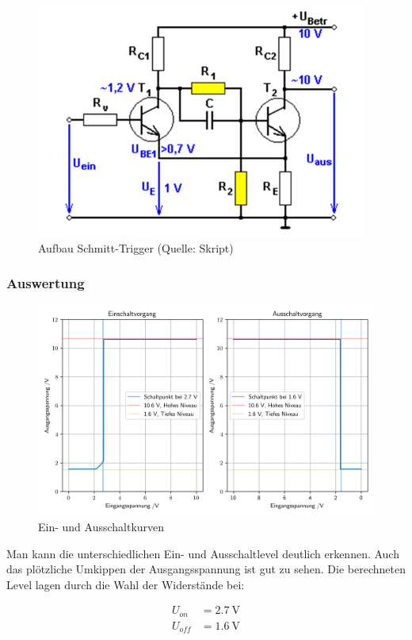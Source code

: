 \documentclass[12pt,twoside,a4paper]{scrartcl}
\begin{document}
				\begin{figure}[H]
					\centering
					\includegraphics[width = 0.8 \textwidth]{Pictures/schmitt}
					\caption{Aufbau Schmitt-Trigger (Quelle: Skript)}
				\end{figure}

			\subsubsection{Auswertung}

			\begin{figure}[H]
				\centering
				\includegraphics[width = \textwidth]{Plots/schmitt/schmitt_trigger}
				\caption{Ein- und Ausschaltkurven}
				\label{Schmitt}
			\end{figure}

			Man kann die unterschiedlichen Ein- und Ausschaltlevel deutlich erkennen. Auch das plötzliche Umkippen der Ausgangsspannung ist gut zu sehen.
			Die berechneten Level lagen durch die Wahl der Widerstände bei:

			\begin{align}
				U_{on} &= \SI{2.7}{\volt} \\
				U_{off} &= \SI{1.6}{\volt}
			\end{align}
\end{document}
